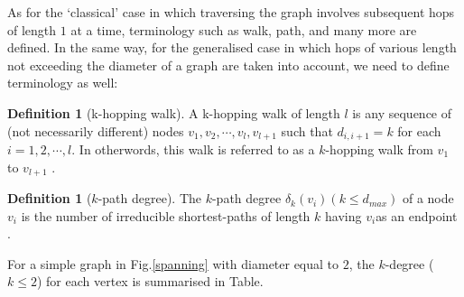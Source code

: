 \documentclass[10pt,a4paper]{article}
\theoremstyle{plain}
\theoremstyle{definition}
\newtheorem{defn}[subsection]{Definition}
\begin{document}
    	    As for the `classical' case in which traversing the graph involves subsequent hops of length $1$ at a time, terminology such as walk, path, and many more are defined. In the same way, for the generalised case in which hops of various length not exceeding the diameter of a graph are taken into account, we need to define terminology as well:\\
    	    \begin{defn}[k-hopping walk]
    	    	A k-hopping walk of length $l$ is any sequence of (not necessarily different) nodes $v_1,v_2, \cdots,v_l, v_{l+1}$ such that $d_{i,i+1} = k$ for each $i=1,2, \cdots, l.$ In otherwords, this walk is referred to as a $k$-hopping walk from $v_1$ to $v_{l+1}$ \citep{estrada2012path}.\\ 
    	    \end{defn}
    	    
    	    
    	    \begin{defn}[$k$-path degree]
    	    	The $k$-path degree $\delta_k(v_i)(k\leq d_{max})$ of a node $v_i$ is the number of irreducible shortest-paths of length $k$ having $v_i$as an endpoint \citep{estrada2012path}. \\
    	    \end{defn}
            For a simple graph in Fig.\ref{spanning} with diameter equal to $2$, the $k$-degree ($k\leq 2 $) for each vertex is summarised in Table.
           
\end{document}
